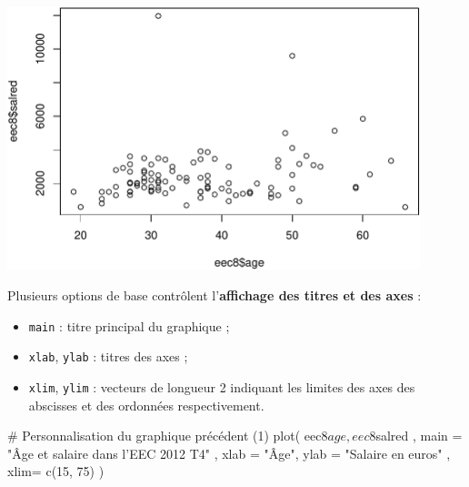 \documentclass[12pt,twosided, notitlepage]{book}
\newenvironment{Shaded}{}{}
\newcommand{\KeywordTok}[1]{\textcolor[rgb]{0.00,0.00,1.00}{#1}}
\newcommand{\DataTypeTok}[1]{#1}
\newcommand{\DecValTok}[1]{#1}
\newcommand{\StringTok}[1]{\textcolor[rgb]{0.00,0.50,0.50}{#1}}
\newcommand{\CommentTok}[1]{\textcolor[rgb]{0.00,0.50,0.00}{#1}}
\newcommand{\OperatorTok}[1]{#1}
\newcommand{\NormalTok}[1]{#1}
\providecommand{\tightlist}{%
  \setlength{\itemsep}{0pt}\setlength{\parskip}{0pt}}
\renewenvironment{Shaded}{\begin{snugshade}}{\end{snugshade}}
\begin{document}
\begin{Shaded}
\end{Shaded}

\begin{center}\includegraphics[width=12cm]{livret_files/figure-latex/unnamed-chunk-435-1} \end{center}

Plusieurs options de base contrôlent l'\textbf{affichage des titres et
des axes} :

\begin{itemize}
\tightlist
\item
  \texttt{main} : titre principal du graphique ;
\item
  \texttt{xlab}, \texttt{ylab} : titres des axes ;
\item
  \texttt{xlim}, \texttt{ylim} : vecteurs de longueur 2 indiquant les
  limites des axes des abscisses et des ordonnées respectivement.
\end{itemize}

\begin{Shaded}
\begin{Highlighting}[]
\CommentTok{# Personnalisation du graphique précédent (1)}
\KeywordTok{plot}\NormalTok{(}
\NormalTok{  eec8}\OperatorTok{$}\NormalTok{age, eec8}\OperatorTok{$}\NormalTok{salred}
\NormalTok{  , }\DataTypeTok{main =} \StringTok{"Âge et salaire dans l'EEC 2012 T4"}
\NormalTok{  , }\DataTypeTok{xlab =} \StringTok{"Âge"}\NormalTok{, }\DataTypeTok{ylab =} \StringTok{"Salaire en euros"}
\NormalTok{  , }\DataTypeTok{xlim=} \KeywordTok{c}\NormalTok{(}\DecValTok{15}\NormalTok{, }\DecValTok{75}\NormalTok{)}
\NormalTok{)}
\end{Highlighting}
\end{Shaded}
\end{document}
